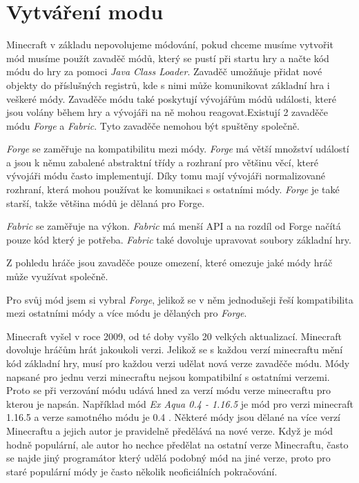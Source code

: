 \documentclass[FM,RP]{tulthesis}
\begin{document}
\chapter{Vytváření modu}
    Minecraft v základu nepovolujeme módování, pokud chceme musíme vytvořit mód musíme použít zavaděč módů, který se pustí při startu hry a načte kód módu do hry za pomoci \textit{Java Class Loader}. Zavaděč umožňuje přidat nové objekty do příslušných registrů, kde s nimi může komunikovat základní hra i veškeré módy.  Zavaděče módu také poskytují vývojářům módů události, které jsou volány během hry a vývojáři na ně mohou reagovat.Existují 2 zavaděče módu \textit{Forge} a \textit{Fabric}. Tyto zavaděče nemohou být spuštěny společně.
 \par   \textit{Forge} se zaměřuje na kompatibilitu mezi módy. \textit{Forge} má větší množství událostí a jsou k němu zabalené abstraktní třídy a rozhraní pro většinu věcí, které vývojáři módu často implementují. Díky tomu mají vývojáři normalizované rozhraní, která mohou používat ke komunikaci s ostatními módy. \textit{Forge} je také starší, takže většina módů je dělaná pro Forge.
\par    \textit{Fabric} se zaměřuje na výkon. \textit{Fabric} má menší API a na rozdíl od Forge načítá pouze kód který je potřeba. \textit{Fabric} také dovoluje upravovat soubory základní hry.
\par    Z pohledu hráče jsou zavaděče pouze omezení, které omezuje jaké módy hráč může využívat společně.
\par    Pro svůj mód jsem si vybral \textit{Forge}, jelikož se v něm jednodušeji řeší kompatibilita mezi ostatními módy a více módu je dělaných pro \textit{Forge}.
\par    Minecraft vyšel v roce 2009, od té doby vyšlo 20 velkých aktualizací. Minecraft dovoluje hráčům hrát jakoukoli verzi. Jelikož se s každou verzí minecraftu mění kód základní hry, musí pro každou verzi udělat nová verze zavaděče módu. Módy napsané pro jednu verzi minecraftu nejsou kompatibilní s ostatními verzemi. Proto se při verzování  módu udává hned za verzí módu verze minecraftu pro kterou je napsán. Například mód\textit{ Ex Aqua 0.4 - 1.16.5}  je mód pro verzi minecraft 1.16.5 a verze samotného módu je 0.4 . Některé módy jsou dělané na více verzí Minecraftu a jejich autor je pravidelně předělává na nové verze. Když je mód hodně populární, ale autor ho nechce předělat na ostatní verze Minecraftu, často se najde jiný programátor který udělá podobný mód na jiné verze, proto pro staré populární módy je často několik neoficiálních pokračování.   
\end{document}

